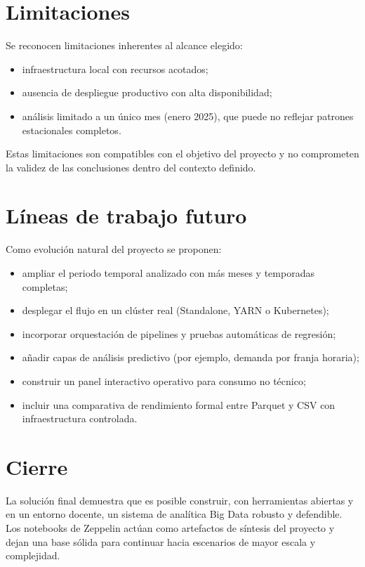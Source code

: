 \section{Limitaciones}
Se reconocen limitaciones inherentes al alcance elegido:
\begin{itemize}
	\item infraestructura local con recursos acotados;
	\item ausencia de despliegue productivo con alta disponibilidad;
	\item análisis limitado a un único mes (enero 2025), que puede no
	reflejar patrones estacionales completos.
\end{itemize}

Estas limitaciones son compatibles con el objetivo del proyecto y no comprometen la
validez de las conclusiones dentro del contexto definido.

\section{Líneas de trabajo futuro}
Como evolución natural del proyecto se proponen:
\begin{itemize}
	\item ampliar el periodo temporal analizado con más meses y temporadas completas;
	\item desplegar el flujo en un clúster real (Standalone, YARN o Kubernetes);
	\item incorporar orquestación de pipelines y pruebas automáticas de regresión;
	\item añadir capas de análisis predictivo (por ejemplo, demanda por franja horaria);
	\item construir un panel interactivo operativo para consumo no técnico;
	\item incluir una comparativa de rendimiento formal entre Parquet y CSV con
	infraestructura controlada.
\end{itemize}

\section{Cierre}
La solución final demuestra que es posible construir, con herramientas abiertas y
en un entorno docente, un sistema de analítica Big Data robusto y defendible.
Los notebooks de Zeppelin actúan como artefactos de síntesis del proyecto y dejan
una base sólida para continuar hacia escenarios de mayor escala y complejidad.

